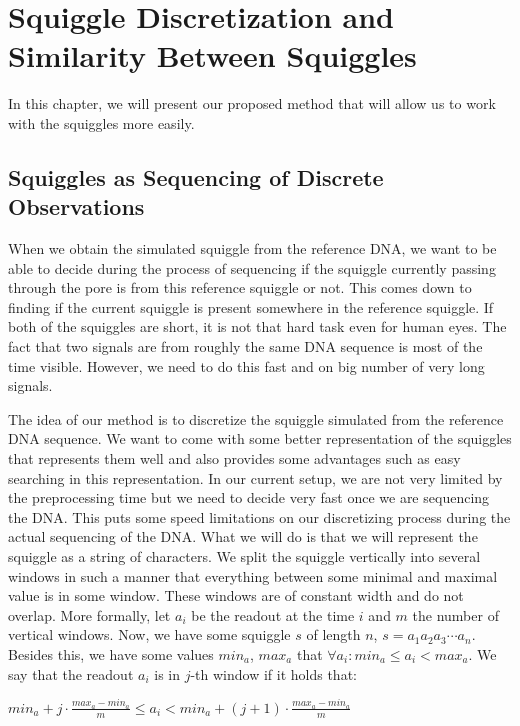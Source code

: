 \chapter{Squiggle Discretization and Similarity Between Squiggles}

\label{kap:proposedMethod}

In this chapter, we will present our proposed method that will allow us to work
with the squiggles more easily.

\section{Squiggles as Sequencing of Discrete Observations}

When we obtain the simulated squiggle from the reference DNA, we want to be able
to decide during the process of sequencing if the squiggle currently passing
through the pore is from this reference squiggle or not. This comes down to finding if the
current squiggle is present somewhere in the reference squiggle. If both of the squiggles
are short, it is not that hard task even for human eyes. The fact that two signals are from
roughly the same DNA sequence is most of the time visible. However, we need to do
this fast and on big number of very long signals.

The idea of our method is to discretize the squiggle simulated from the
reference DNA sequence. We want to come with some better representation of the
squiggles that represents them well and also provides some advantages such as
easy searching in this representation. In our current setup, we are
not very limited by the preprocessing time but we need to decide very fast once
we are sequencing the DNA. This puts some speed limitations on our discretizing
process during the actual sequencing of the DNA. What we will do is that we will
represent the squiggle as a string of characters. We split the squiggle vertically into several
windows in such a manner that everything between some minimal and maximal
value is in some window. These windows are of constant width and do not
overlap. More formally, let $a_i$ be the readout at the time $i$ and $m$ the number of
vertical windows. Now, we have some squiggle $s$ of length $n$, $s=a_1a_2a_3\cdots a_n$.
Besides this, we have some values $min_a$, $max_a$ that $\forall a_i: min_a \leq a_i < max_a$.
We say that the readout $a_i$ is in $j$-th window if it holds that:

\begin{center}
$min_a + j\cdot \frac{max_a-min_a}{m} \leq a_i < min_a + (j+1)\cdot \frac{max_a-min_a}{m}$
\end{center}

